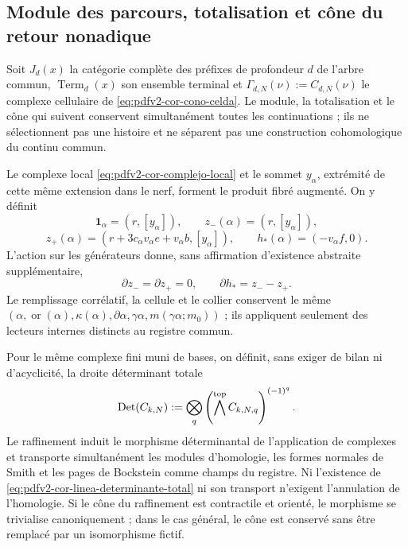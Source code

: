 \subsection{Module des parcours, totalisation et cône du retour nonadique}
Soit \(J_d(x)\) la catégorie complète des préfixes de profondeur \(d\) de l'arbre commun, \(\operatorname{Term}_d(x)\) son ensemble terminal et \(\Gamma_{d,N}(\nu):=C_{d,N}(\nu)\) le complexe cellulaire de \eqref{eq:pdfv2-cor-cono-celda}. Le module, la totalisation et le cône qui suivent conservent simultanément toutes les continuations ; ils ne sélectionnent pas une histoire et ne séparent pas une construction cohomologique du continu commun.
\begingroup
\let\section\subsection

\endgroup

Le complexe local \eqref{eq:pdfv2-cor-complejo-local} et le sommet \(y_\alpha\), extrémité de cette même extension dans le nerf, forment le produit fibré augmenté. On y définit
\begin{equation}
\label{eq:pdfv2-cor-zpm-h}
 \mathbf1_\alpha=(r,[y_\alpha]),\qquad
 z_-(\alpha)=(r,[y_\alpha]),
\end{equation}
\begin{equation}
\label{eq:pdfv2-cor-zplus-h}
 z_+(\alpha)=
 (r+3c_\alpha v_\alpha e+v_\alpha b,[y_\alpha]),
 \qquad
 h_*(\alpha)=(-v_\alpha f,0).
\end{equation}
L'action sur les générateurs donne, sans affirmation d'existence abstraite supplémentaire,
\begin{equation}
\label{eq:pdfv2-cor-filler}
 \partial z_-=\partial z_+=0,\qquad
 \partial h_*=z_--z_+.
\end{equation}
Le remplissage corrélatif, la cellule et le collier conservent le même \((\alpha,\operatorname{or}(\alpha),\kappa(\alpha),\partial\alpha,
\gamma\alpha,m(\gamma\alpha;m_0))\) ; ils appliquent seulement des lecteurs internes distincts au registre commun.

Pour le même complexe fini muni de bases, on définit, sans exiger de bilan ni d'acyclicité, la droite déterminant totale
\begin{equation}
\label{eq:pdfv2-cor-linea-determinante-total}
 \operatorname{Det}(C_{k,N}):=
 \bigotimes_q
 \left(\bigwedge^{\rm top}C_{k,N,q}\right)^{(-1)^q}.
\end{equation}
Le raffinement induit le morphisme déterminantal de l'application de complexes et transporte simultanément les modules d'homologie, les formes normales de Smith et les pages de Bockstein comme champs du registre. Ni l'existence de \eqref{eq:pdfv2-cor-linea-determinante-total} ni son transport n'exigent l'annulation de l'homologie. Si le cône du raffinement est contractile et orienté, le morphisme se trivialise canoniquement ; dans le cas général, le cône est conservé sans être remplacé par un isomorphisme fictif.

